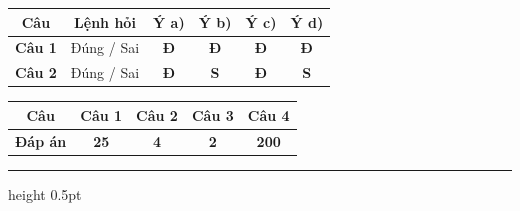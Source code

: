 \documentclass[11pt,a4paper]{article}
\begin{document}
\vspace{3pt}
\begin{center}
\renewcommand{\arraystretch}{1.2}
\begin{tabular}{|c|c|c|c|c|c|}
\hline
\rowcolor{tableGreen}
\textbf{Câu} & \textbf{Lệnh hỏi} & \textbf{Ý a)} & \textbf{Ý b)} & \textbf{Ý c)} & \textbf{Ý d)} \\
\hline
\textbf{Câu 1} & Đúng / Sai & \textbf{\color{hfRed}Đ} & \textbf{\color{hfRed}Đ} & \textbf{\color{hfRed}Đ} & \textbf{\color{hfRed}Đ} \\
\hline
\textbf{Câu 2} & Đúng / Sai & \textbf{\color{hfRed}Đ} & \textbf{S} & \textbf{\color{hfRed}Đ} & \textbf{S} \\
\hline
\end{tabular}
\end{center}

\vspace{3pt}
\begin{center}
\renewcommand{\arraystretch}{1.2}
\begin{tabular}{|c|c|c|c|c|}
\hline
\rowcolor{tableGreen}
\textbf{Câu} & \textbf{Câu 1} & \textbf{Câu 2} & \textbf{Câu 3} & \textbf{Câu 4} \\
\hline
\textbf{Đáp án} & \textbf{\color{hfRed}25} & \textbf{\color{hfRed}4} & \textbf{\color{hfRed}2} & \textbf{\color{hfRed}200} \\
\hline
\end{tabular}
\end{center}
\vspace{6pt}
\hrule height 0.5pt
\vspace{6pt}
\end{document}

